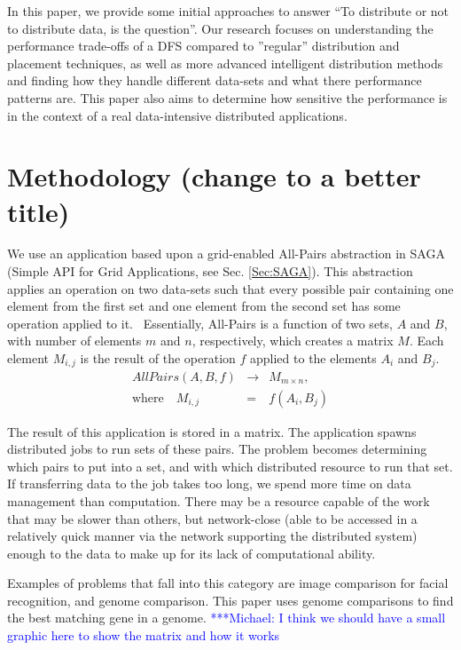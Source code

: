 \documentclass{rspublic}
\newcommand{\micnote}[1]{ {\textcolor{blue} { ***Michael: #1 }}}
\begin{document}
In this paper, we provide some initial approaches to answer
 ``To distribute or not to distribute data, is the question''. 
 Our research focuses on understanding the performance trade-offs
  of a DFS compared to ''regular''
distribution and placement techniques, as well as more advanced
intelligent distribution methods and finding how
they handle different data-sets and what there performance patterns
are.  This paper also aims to determine
how sensitive the performance is in the context of a real data-intensive
distributed applications.

\section {Methodology (change to a better title)}
We use an application based upon a
grid-enabled All-Pairs abstraction in SAGA (Simple API for
Grid Applications, see Sec. \ref{Sec:SAGA}). This abstraction applies an operation on two
data-sets such that every possible pair containing one element from the
first set and one element from the second set has some operation
applied to it.~\citep{Interop, AllPairs}  Essentially, All-Pairs is a
function of two sets, $A$ and $B$, with number of elements $m$ and $n$, respectively, which creates a matrix $M$. Each element $M_{i,j}$ is the
result of the operation $f$ applied to the elements $A_i$ and $B_j$.
\begin{eqnarray}
 AllPairs(A, B, f) & \rightarrow & M_{m \times n}, \\
\mbox{where} \quad M_{i,j} & = & f(A_{i},B_{j})
 \end{eqnarray}
 
The result of this application is stored in a matrix.  The
application spawns distributed jobs to run sets of these pairs.  The
problem becomes determining which pairs to put into a set, and with
which distributed resource to run that set.  If transferring data to the
job takes too long, we spend more time on data management than
computation.  There may be a resource capable of the work that may be
slower than others, but network-close (able to be accessed in a
relatively quick manner via the network supporting the distributed
system) enough to the data to make up for its lack of computational
ability. 

Examples of problems that
fall into this category are image comparison for facial recognition, and
genome comparison.  This paper uses genome comparisons to find the best
matching gene in a genome. \micnote{I think we should have a small
graphic here to show the matrix and how it works}
\end{document}
